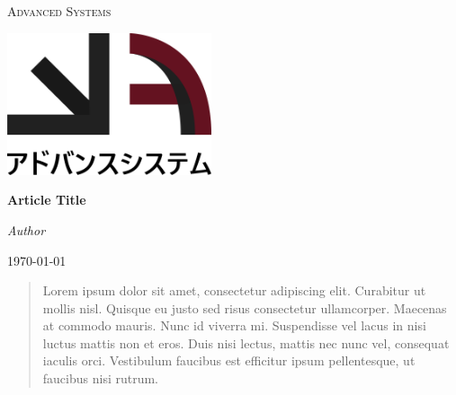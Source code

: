 \documentclass[a4paper]{article}
\begin{document}
\begin{titlepage}
    \centering
    {\scshape\Huge Advanced Systems \par}
    \par\vspace{1cm}
    \includegraphics[width=0.45\textwidth]{advanced-systems-logo.png}\par
    \vspace{3cm}
    {\huge\bfseries Article Title \par}
    \vspace{1cm}
    {\LARGE\itshape Author \par}
    \vspace{1cm}
    {\large\today\par}
    \vfill
    \begin{abstract}
        Lorem ipsum dolor sit amet, consectetur adipiscing elit. Curabitur ut
        mollis nisl. Quisque eu justo sed risus consectetur ullamcorper. Maecenas
        at commodo mauris. Nunc id viverra mi. Suspendisse vel lacus in nisi luctus
        mattis non et eros. Duis nisi lectus, mattis nec nunc vel, consequat iaculis
        orci. Vestibulum faucibus est efficitur ipsum pellentesque, ut faucibus
        nisi rutrum.
    \end{abstract}
\end{titlepage}

\newpage

\printnoidxglossary[type=\acronymtype]

\newpage

\tableofcontents

\newpage







\newpage

\medskip
\printbibliography
\end{document}
